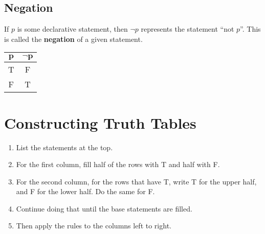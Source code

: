 \documentclass[../notes.tex]{subfiles}
\begin{document}
			\subsection{Negation}
				If $p$ is some declarative statement, then $\lnot p$ represents the statement ``not $p$''. This is called the \textbf{negation} of a given statement.
				\begin{center}
					\begin{tabular}{| c | c |}
						\hline
						$\mathbf{p}$ & $\mathbf{\lnot p}$\\
						\hline
						T & F\\
						F & T\\
						\hline
					\end{tabular}
				\end{center}
		\section{Constructing Truth Tables}
			\begin{enumerate}
				\item List the statements at the top.
				\item For the first column, fill half of the rows with T and half with F.
				\item For the second column, for the rows that have T, write T for the upper half, and F for the lower half. Do the same for F.
				\item Continue doing that until the base statements are filled.
				\item Then apply the rules to the columns left to right.
			\end{enumerate}
\end{document}
